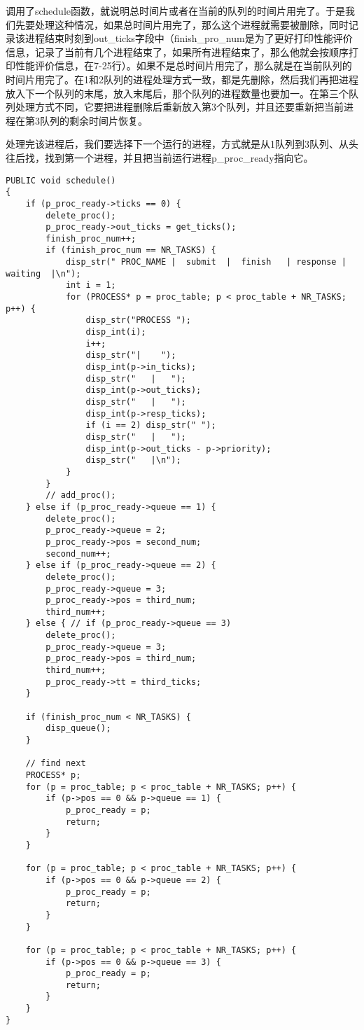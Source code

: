 \documentclass{whureport}
\begin{document}
调用了schedule函数，就说明总时间片或者在当前的队列的时间片用完了。于是我们先要处理这种情况，如果总时间片用完了，那么这个进程就需要被删除，同时记录该进程结束时刻到out\_ticks字段中（finish\_pro\_num是为了更好打印性能评价信息，记录了当前有几个进程结束了，如果所有进程结束了，那么他就会按顺序打印性能评价信息，在7-25行）。如果不是总时间片用完了，那么就是在当前队列的时间片用完了。在1和2队列的进程处理方式一致，都是先删除，然后我们再把进程放入下一个队列的末尾，放入末尾后，那个队列的进程数量也要加一。在第三个队列处理方式不同，它要把进程删除后重新放入第3个队列，并且还要重新把当前进程在第3队列的剩余时间片恢复。

处理完该进程后，我们要选择下一个运行的进程，方式就是从1队列到3队列、从头往后找，找到第一个进程，并且把当前运行进程p\_proc\_ready指向它。
\begin{lstlisting}
PUBLIC void schedule()
{
	if (p_proc_ready->ticks == 0) {
		delete_proc();
		p_proc_ready->out_ticks = get_ticks();
		finish_proc_num++;
		if (finish_proc_num == NR_TASKS) {
			disp_str(" PROC_NAME |  submit  |  finish   | response |  waiting  |\n");
			int i = 1;
			for (PROCESS* p = proc_table; p < proc_table + NR_TASKS; p++) {
				disp_str("PROCESS ");
				disp_int(i);
				i++;
				disp_str("|    ");
				disp_int(p->in_ticks);
				disp_str("   |   ");
				disp_int(p->out_ticks);
				disp_str("   |   ");
				disp_int(p->resp_ticks);
				if (i == 2) disp_str(" ");
				disp_str("   |   ");
				disp_int(p->out_ticks - p->priority);
				disp_str("   |\n");
			}
		}
		// add_proc();
	} else if (p_proc_ready->queue == 1) {
		delete_proc();
		p_proc_ready->queue = 2;
		p_proc_ready->pos = second_num;
		second_num++;
	} else if (p_proc_ready->queue == 2) {
		delete_proc();
		p_proc_ready->queue = 3;
		p_proc_ready->pos = third_num;
		third_num++;
	} else { // if (p_proc_ready->queue == 3)
		delete_proc();
		p_proc_ready->queue = 3;
		p_proc_ready->pos = third_num;
		third_num++;
		p_proc_ready->tt = third_ticks;
	}

    if (finish_proc_num < NR_TASKS) {
		disp_queue();
    }

	// find next
	PROCESS* p;
	for (p = proc_table; p < proc_table + NR_TASKS; p++) {
		if (p->pos == 0 && p->queue == 1) {
			p_proc_ready = p;
			return;
		}
	}

	for (p = proc_table; p < proc_table + NR_TASKS; p++) {
		if (p->pos == 0 && p->queue == 2) {
			p_proc_ready = p;
			return;
		}
	}

	for (p = proc_table; p < proc_table + NR_TASKS; p++) {
		if (p->pos == 0 && p->queue == 3) {
			p_proc_ready = p;
			return;
		}
	}
}
\end{lstlisting}
\end{document}
